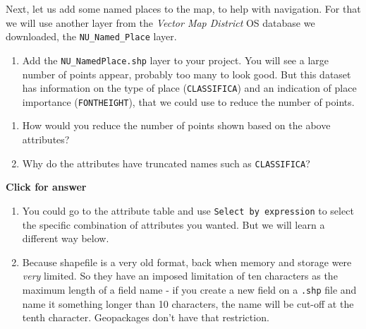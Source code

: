 \documentclass[
  letterpaper,
  DIV=11,
  numbers=noendperiod]{scrreprt}
\providecommand{\tightlist}{%
  \setlength{\itemsep}{0pt}\setlength{\parskip}{0pt}}\usepackage{longtable,booktabs,array}
\begin{document}
Next, let us add some named places to the map, to help with navigation.
For that we will use another layer from the \emph{Vector Map District}
OS database we downloaded, the \texttt{NU\_Named\_Place} layer.

\begin{enumerate}
\def\labelenumi{(\arabic{enumi})}
\setcounter{enumi}{236}
\tightlist
\item
  Add the \texttt{NU\_NamedPlace.shp} layer to your project. You will
  see a large number of points appear, probably too many to look good.
  But this dataset has information on the type of place
  (\texttt{CLASSIFICA}) and an indication of place importance
  (\texttt{FONTHEIGHT}), that we could use to reduce the number of
  points.
\end{enumerate}

\begin{tcolorbox}[enhanced jigsaw, breakable, toptitle=1mm, colback=white, left=2mm, leftrule=.75mm, titlerule=0mm, colframe=quarto-callout-important-color-frame, opacityback=0, title=\textcolor{quarto-callout-important-color}{\faExclamation}\hspace{0.5em}{Stop and Think}, toprule=.15mm, opacitybacktitle=0.6, bottomtitle=1mm, colbacktitle=quarto-callout-important-color!10!white, bottomrule=.15mm, coltitle=black, rightrule=.15mm, arc=.35mm]

\begin{enumerate}
\def\labelenumi{\alph{enumi})}
\item
  How would you reduce the number of points shown based on the above
  attributes?
\item
  Why do the attributes have truncated names such as
  \texttt{CLASSIFICA}?
\end{enumerate}

\end{tcolorbox}

\begin{tcolorbox}[enhanced jigsaw, leftrule=.75mm, colframe=quarto-callout-important-color-frame, breakable, toprule=.15mm, bottomrule=.15mm, arc=.35mm, rightrule=.15mm, opacityback=0, colback=white, left=2mm]

\vspace{-3mm}\textbf{Click for answer}\vspace{3mm}

\begin{enumerate}
\def\labelenumi{\alph{enumi})}
\item
  You could go to the attribute table and use
  \texttt{Select\ by\ expression} to select the specific combination of
  attributes you wanted. But we will learn a different way below.
\item
  Because shapefile is a very old format, back when memory and storage
  were \emph{very} limited. So they have an imposed limitation of ten
  characters as the maximum length of a field name - if you create a new
  field on a \texttt{.shp} file and name it something longer than 10
  characters, the name will be cut-off at the tenth character.
  Geopackages don't have that restriction.
\end{enumerate}

\end{tcolorbox}
\end{document}
